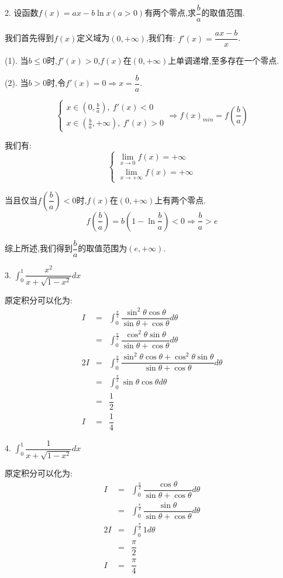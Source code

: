 2. 设函数$f(x)=ax-b\ln x(a>0)$有两个零点,求$\dfrac{b}{a}$的取值范围.
\begin{solution}

	我们首先得到$f(x)$定义域为$(0,+\infty)$,我们有:  $f'(x)=\dfrac{ax-b}{x}$.
	
	(1). 当$b\leq 0$时,$f'(x)>0$,$f(x)$在$(0,+\infty)$上单调递增,至多存在一个零点.
	
	(2). 当$b>0$时,令$f'(x)=0\Rightarrow x=\dfrac{b}{a}$.
	
	$$\left\lbrace
	\begin{array}{l}
		x\in(0,\frac{b}{a}),\ f'(x)<0\\
		x\in(\frac{b}{a},+\infty),\ f'(x)>0
	\end{array}
	\right. \Rightarrow f(x)_{min}=f(\dfrac{b}{a})$$
	
	我们有:  $$\left\lbrace
	\begin{array}{l}
		\lim\limits_{x\rightarrow 0}f(x)=+\infty\\
		\lim\limits_{x\rightarrow +\infty}f(x)=+\infty
	\end{array}
	\right. $$
	
	当且仅当$f(\dfrac{b}{a})<0$时,$f(x)$在$(0,+\infty)$上有两个零点.
	$$f(\dfrac{b}{a})=b(1-\ln\dfrac{b}{a})<0\Rightarrow \dfrac{b}{a}>e$$
	
	综上所述,我们得到$\dfrac{b}{a}$的取值范围为$(e,+\infty)$.
\end{solution}

3. $\int_{0}^{1}\dfrac{x^2}{x+\sqrt{1-x^2}}dx$
\begin{solution}

	原定积分可以化为:  
	\begin{eqnarray*}
		I&=&\int_{0}^{\frac{\pi}{2}}\dfrac{\sin^2\theta\cos\theta}{\sin\theta+\cos\theta}d\theta\\
		&=&\int_{0}^{\frac{\pi}{2}}\dfrac{\cos^2\theta\sin\theta}{\sin\theta+\cos\theta}d\theta\\
		2I&=&\int_{0}^{\frac{\pi}{2}}\dfrac{\sin^2\theta\cos\theta+\cos^2\theta\sin\theta}{\sin\theta+\cos\theta}d\theta\\
		&=&\int_{0}^{\frac{\pi}{2}}\sin\theta\cos\theta d\theta\\
		&=&\dfrac{1}{2}\\
		I&=&\dfrac{1}{4}
	\end{eqnarray*}
\end{solution}

4. $\int_{0}^{1}\dfrac{1}{x+\sqrt{1-x^2}}dx$
\begin{solution}

	原定积分可以化为:  
	\begin{eqnarray*}
		I&=&\int_{0}^{\frac{\pi}{2}}\dfrac{\cos\theta}{\sin\theta+\cos\theta}d\theta\\
		&=&\int_{0}^{\frac{\pi}{2}}\dfrac{\sin\theta}{\sin\theta+\cos\theta}d\theta\\
		2I&=&\int_{0}^{\frac{\pi}{2}}1d\theta\\
		&=&\dfrac{\pi}{2}\\
		I&=&\dfrac{\pi}{4}
	\end{eqnarray*}
\end{solution}

